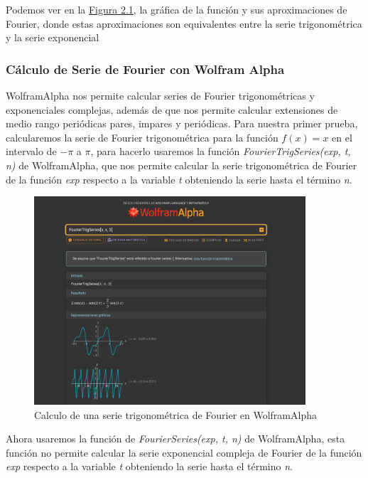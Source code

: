 Podemos ver en la \hyperref[fig:fourier-estado-del-arte]{Figura 2.1}, la gráfica de la función y sus aproximaciones de Fourier, donde estas aproximaciones son equivalentes entre la serie trigonométrica y la serie exponencial

\subsubsection{Cálculo de Serie de Fourier con Wolfram Alpha}
WolframAlpha nos permite calcular series de Fourier trigonométricas y exponenciales complejas, además de que nos permite calcular extensiones de medio rango periódicas pares, impares y periódicas.
Para nuestra primer prueba, calcularemos la serie de Fourier trigonométrica para la función \( f(x) = x \) en el intervalo de \(-\pi\) a \(\pi\), para hacerlo usaremos la función \emph{FourierTrigSeries(exp, t, n)} de WolframAlpha, que nos permite calcular la serie trigonométrica de Fourier de la función \emph{exp} respecto a la variable \emph{t} obteniendo la serie hasta el término \emph{n}.
\begin{figure}[H]
	\centering
	\includegraphics[width=0.9\textwidth]{img/chapter02/wolfram_trig_series.png}
	\caption{Calculo de una serie trigonométrica de Fourier en WolframAlpha}
	\label{fig:wolfram-trig-series}  %
\end{figure}
Ahora usaremos la función de \emph{FourierSeries(exp, t, n)} de WolframAlpha, esta función no permite calcular la serie exponencial compleja de Fourier de la función \emph{exp} respecto a la variable \emph{t} obteniendo la serie hasta el término \emph{n}.
